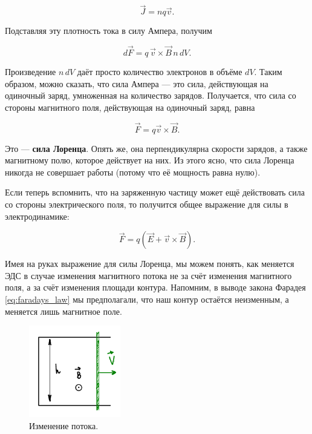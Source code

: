 \documentclass[11pt,a4paper]{article}
\numberwithin{equation}{section}
\begin{document}
\begin{equation}
  \label{eq:der_lorentz_force_2}
  \vec{J} = n q \vec{v}.
\end{equation}

Подставляя эту плотность тока в силу Ампера, получим

\begin{equation}
  \label{eq:der_lorentz_force_3}
  d\vec{F} = q \, \vec{v} \times \vec{B} \, n\, dV.
\end{equation}

Произведение $n \, dV$ даёт просто количество электронов в объёме
$dV$. Таким образом, можно сказать, что сила Ампера --- это сила,
действующая на одиночный заряд, умноженная на количество
зарядов. Получается, что сила со стороны магнитного поля, действующая
на одиночный заряд, равна

\begin{equation}
  \label{eq:lorentz_force}
  \vec{F} = q \vec{v} \times \vec{B}.
\end{equation}

Это --- \textbf{сила Лоренца}. Опять же, она перпендикулярна скорости
зарядов, а также магнитному полю, которое действует на них. Из этого
ясно, что сила Лоренца никогда не совершает работы (потому что её
мощность равна нулю). 

Если теперь вспомнить, что на заряженную частицу может ещё действовать
сила со стороны электрического поля, то получится общее выражение для
силы в электродинамике:

\begin{equation}
  \label{eq:force_electrodynamics}
  \vec{F} = q (\vec{E} + \vec{v} \times \vec{B}).
\end{equation}

Имея на руках выражение для силы Лоренца, мы можем понять, как
меняется ЭДС в случае изменения магнитного потока не за счёт изменения
магнитного поля, а за счёт изменения площади контура. Напомним, в
выводе закона Фарадея \eqref{eq:faradays_law} мы предполагали, что наш
контур остаётся неизменным, а меняется лишь магнитное поле. 

\begin{figure}
  \vspace{-1cm}
  \begin{center}
  \includegraphics[width=4cm]{faraday.pdf}  
  \end{center}
  \vspace{-1cm}
  \caption{Изменение потока.}
  \label{fig:faraday}
\end{figure}
\end{document}
